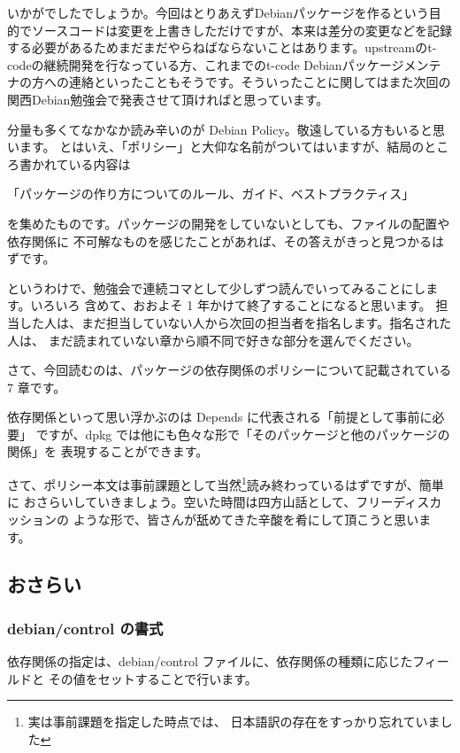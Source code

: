 \documentclass[mingoth,a4paper]{jsarticle}
\begin{document}
いかがでしたでしょうか。今回はとりあえずDebianパッケージを作るという目的でソースコードは変更を上書きしただけですが、本来は差分の変更などを記録する必要があるためまだまだやらねばならないことはあります。upstreamのt-codeの継続開発を行なっている方、これまでのt-code Debianパッケージメンテナの方への連絡といったこともそうです。そういったことに関してはまた次回の関西Debian勉強会で発表させて頂ければと思っています。


\clearpage
{}

分量も多くてなかなか読み辛いのが Debian Policy。敬遠している方もいると思います。
とはいえ、「ポリシー」と大仰な名前がついてはいますが、結局のところ書かれている内容は

「パッケージの作り方についてのルール、ガイド、ベストプラクティス」

を集めたものです。パッケージの開発をしていないとしても、ファイルの配置や依存関係に
不可解なものを感じたことがあれば、その答えがきっと見つかるはずです。


というわけで、勉強会で連続コマとして少しずつ読んでいってみることにします。いろいろ
含めて、おおよそ 1 年かけて終了することになると思います。
担当した人は、まだ担当していない人から次回の担当者を指名します。指名された人は、
まだ読まれていない章から順不同で好きな部分を選んでください。

さて、今回読むのは、パッケージの依存関係のポリシーについて記載されている 7 章です。

依存関係といって思い浮かぶのは Depends に代表される「前提として事前に必要」
ですが、dpkg では他にも色々な形で「そのパッケージと他のパッケージの関係」を
表現することができます。

さて、ポリシー本文は事前課題として当然\footnote{実は事前課題を指定した時点では、
日本語訳の存在をすっかり忘れていました}読み終わっているはずですが、簡単に
おさらいしていきましょう。空いた時間は四方山話として、フリーディスカッションの
ような形で、皆さんが舐めてきた辛酸を肴にして頂こうと思います。

\subsection{おさらい}
\subsubsection{debian/control の書式}

依存関係の指定は、debian/control ファイルに、依存関係の種類に応じたフィールドと
その値をセットすることで行います。
\end{document}
